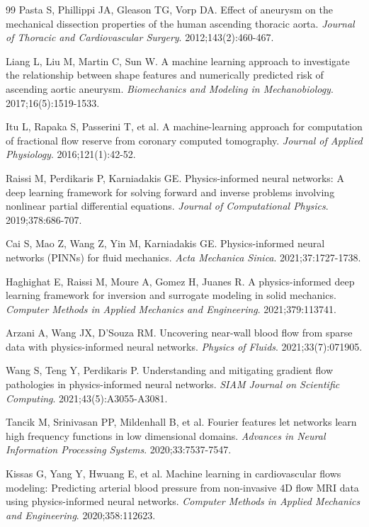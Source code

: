 \documentclass[11pt,a4paper]{article}
\begin{document}
\begin{thebibliography}{99}
 Pasta S, Phillippi JA, Gleason TG, Vorp DA. Effect of aneurysm on the mechanical dissection properties of the human ascending thoracic aorta. \textit{Journal of Thoracic and Cardiovascular Surgery}. 2012;143(2):460-467.

 Liang L, Liu M, Martin C, Sun W. A machine learning approach to investigate the relationship between shape features and numerically predicted risk of ascending aortic aneurysm. \textit{Biomechanics and Modeling in Mechanobiology}. 2017;16(5):1519-1533.

 Itu L, Rapaka S, Passerini T, et al. A machine-learning approach for computation of fractional flow reserve from coronary computed tomography. \textit{Journal of Applied Physiology}. 2016;121(1):42-52.

 Raissi M, Perdikaris P, Karniadakis GE. Physics-informed neural networks: A deep learning framework for solving forward and inverse problems involving nonlinear partial differential equations. \textit{Journal of Computational Physics}. 2019;378:686-707.

 Cai S, Mao Z, Wang Z, Yin M, Karniadakis GE. Physics-informed neural networks (PINNs) for fluid mechanics. \textit{Acta Mechanica Sinica}. 2021;37:1727-1738.

 Haghighat E, Raissi M, Moure A, Gomez H, Juanes R. A physics-informed deep learning framework for inversion and surrogate modeling in solid mechanics. \textit{Computer Methods in Applied Mechanics and Engineering}. 2021;379:113741.

 Arzani A, Wang JX, D'Souza RM. Uncovering near-wall blood flow from sparse data with physics-informed neural networks. \textit{Physics of Fluids}. 2021;33(7):071905.

 Wang S, Teng Y, Perdikaris P. Understanding and mitigating gradient flow pathologies in physics-informed neural networks. \textit{SIAM Journal on Scientific Computing}. 2021;43(5):A3055-A3081.

 Tancik M, Srinivasan PP, Mildenhall B, et al. Fourier features let networks learn high frequency functions in low dimensional domains. \textit{Advances in Neural Information Processing Systems}. 2020;33:7537-7547.

 Kissas G, Yang Y, Hwuang E, et al. Machine learning in cardiovascular flows modeling: Predicting arterial blood pressure from non-invasive 4D flow MRI data using physics-informed neural networks. \textit{Computer Methods in Applied Mechanics and Engineering}. 2020;358:112623.


\end{thebibliography}
\end{document}
